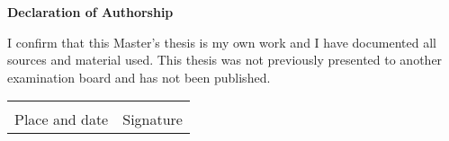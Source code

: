 \setlength{\parindent}{0em}

\thispagestyle{empty}
\begin{center}
	\begin{minipage}[c][0.48\textheight][b]{0.9\textwidth}
		\small
			\textbf{Declaration of Authorship}\par
		\vspace{\baselineskip}
			I confirm that this	Master's thesis is my own work and I have documented all sources and material used. This thesis was not previously presented to another examination board and has not been published.\par			 
   		    \vspace{5\baselineskip}
			\noindent\begin{tabular}{ll}
				\makebox[2.5in]{\hrulefill} & \makebox[2.5in]{\hrulefill}\\
				Place and date & Signature\\
			\end{tabular}
			
	\end{minipage} \par \par
\end{center}
